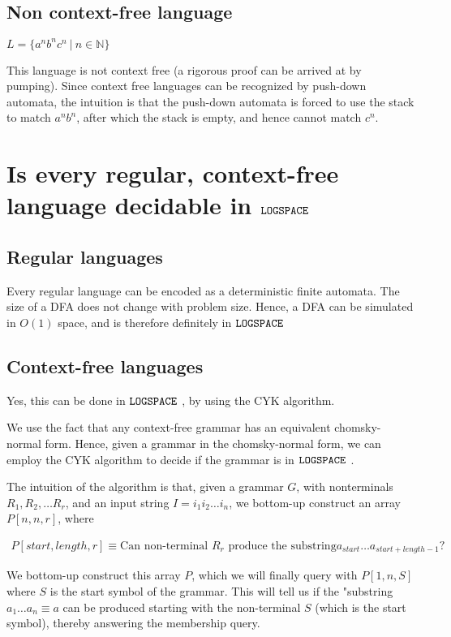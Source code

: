 \documentclass{article}
\begin{document}
\subsection{Non context-free language}
$L = \{ a^n b^n c^n~\vert~n \in \mathbb{N} \}$

This language is not context free (a rigorous proof can be arrived at by pumping).
Since context free languages can be recognized by push-down automata, the intuition
is that the push-down automata is forced to use the stack to match $a^n b^n$,
after which the stack is empty, and hence cannot match $c^n$.



\section{Is every regular, context-free language decidable in $\texttt{LOGSPACE}~$}
\subsection{Regular languages}
Every regular language can be encoded as a deterministic finite automata.
The size of a DFA does not change with problem size. Hence, a DFA can 
be simulated in $O(1)$ space, and is therefore definitely in $\texttt{LOGSPACE}~$


\subsection{Context-free languages}
Yes, this can be done in $\texttt{LOGSPACE}~$, by using the CYK algorithm.

We use the fact that any context-free grammar has an equivalent chomsky-normal
form. Hence, given a grammar in the chomsky-normal form, we can employ the
CYK algorithm to decide if the grammar is in $\texttt{LOGSPACE}~$.

The intuition of the algorithm is that, given a grammar $G$,
with nonterminals $R_1, R_2, \dots R_r$, and an input string
$I = i_1 i_2 \dots i_n$, we bottom-up construct an array
$P[n, n, r]$, where 

\begin{align*}
P[start, length, r] \equiv \text{Can non-terminal $R_r$ produce the substring
$a_{start} \dots a_{start + length -1}$?}
\end{align*}

We bottom-up construct this array $P$, which we will finally query with
$P[1, n, S]$ where $S$ is the start symbol of the grammar. This will tell
us if the "substring $a_1 \dots a_n \equiv a$ can be produced starting
with the non-terminal $S$ (which is the start symbol), thereby answering
the membership query.
\end{document}
